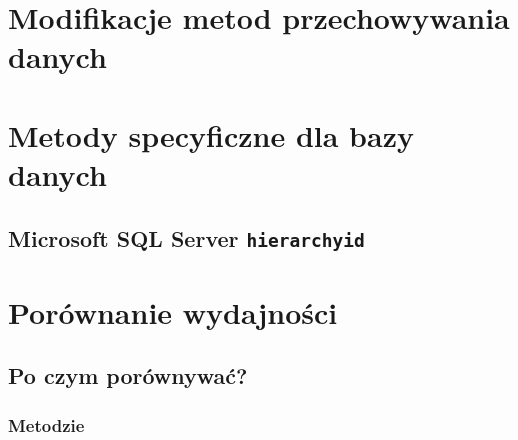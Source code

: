 \documentclass[12pt,a4paper,intlimits,oneside]{report}
\begin{document}


\chapter{Modifikacje metod przechowywania danych}


\chapter{Metody specyficzne dla bazy danych}
	
	
	

	

	\section{Microsoft SQL Server \texttt{hierarchyid}}

	
	

\chapter{Porównanie wydajności}
\section{Po czym porównywać?}
\subsection{Metodzie}
\end{document}

